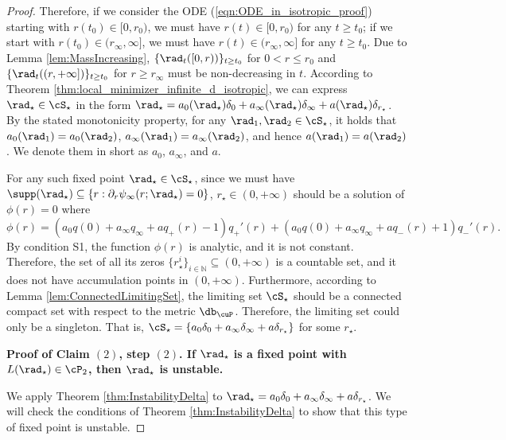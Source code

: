 \documentclass[11pt]{article}
\begin{document}
\begin{proof}
Therefore, if we consider the ODE (\ref{eqn:ODE_in_isotropic_proof}) starting with $r(t_0) \in [0, r_0)$, we must have $r(t) \in [0, r_0)$ for any $t \ge t_0$; if we start with $r(t_0) \in (r_\infty, \infty]$, we must have $r(t) \in (r_\infty, \infty]$ for any $t \ge t_0$. Due to Lemma \ref{lem:MassIncreasing}, $\{\rad_t([0, r))\}_{t \ge t_0}$ for $0 < r \le r_0$ and $\{\rad_t((r, +\infty]) \}_{t \ge t_0}$ for $r \ge r_\infty$ must be non-decreasing in $t$. According to Theorem \ref{thm:local_minimizer_infinite_d_isotropic}, we can express $\rad_\star \in \cS_\star$ in the form $\rad_\star = a_0(\rad_\star) \delta_0 + a_\infty(\rad_\star) \delta_\infty + a(\rad_\star) \delta_{r_\star}$. By the stated monotonicity property, for any $\rad_1, \rad_2 \in \cS_\star$, it holds that $a_0(\rad_1) = a_0(\rad_2)$, $a_\infty(\rad_1) = a_\infty(\rad_2)$, and hence $a(\rad_1) = a(\rad_2)$. We denote them in short as $a_0$, $a_\infty$, and $a$.

For any such fixed point $\rad_\star \in \cS_\star$, since we must have $\supp(\rad_\star) \subseteq \{r: \partial_r \psi_\infty(r; \rad_\star) = 0 \}$, $r_\star \in (0, +\infty)$ should be a solution of $\phi(r) = 0$ where
\[
\phi(r) = (a_0 q(0) + a_\infty q_\infty + a q_+(r) - 1) q_+'(r) + (a_0 q(0) + a_\infty q_\infty + a q_-(r) + 1) q_-'(r).
\] 
By condition {\sf S1}, the function $\phi(r)$ is analytic, and it is not constant. Therefore, the set of all its zeros $\{ r_\star^{i} \}_{i \in \mathbb N} \subseteq (0,  +\infty )$ is a countable set, and it does not have accumulation points in $(0, +\infty)$. Furthermore, according to Lemma \ref{lem:ConnectedLimitingSet}, the limiting set $\cS_\star$ should be a connected compact set with respect to the metric $\db_\cuP$. Therefore, the limiting set could only be a singleton. That is, $\cS_\star = \{a_0 \delta_0 + a_\infty \delta_\infty + a \delta_{r_\star} \}$ for some $r_\star$. 

\vskip 0.2cm
\noindent
{\bf Proof of Claim $(2)$, step $(2)$. If $\rad_\star$ is a fixed point with $L(\rad_\star) \in \cP_2$, then $\rad_\star$ is unstable. }

We apply Theorem \ref{thm:InstabilityDelta} to $\rad_\star = a_0 \delta_0 + a_\infty \delta_\infty + a \delta_{r_\star}$. We will check the conditions of Theorem \ref{thm:InstabilityDelta} to show that this type of fixed point is unstable. 


\end{proof}
\end{document}
